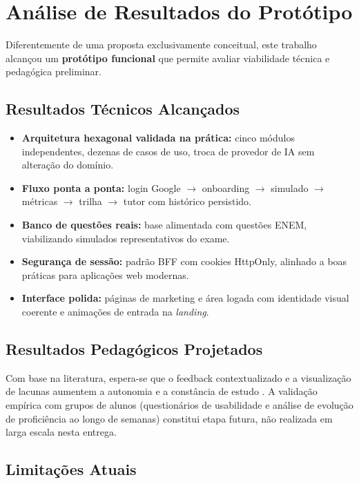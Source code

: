 \documentclass[12pt]{article}
\begin{document}
\section{Análise de Resultados do Protótipo}
\label{sec:resultados}

Diferentemente de uma proposta exclusivamente conceitual, este trabalho alcançou um \textbf{protótipo funcional} que permite avaliar viabilidade técnica e pedagógica preliminar.

\subsection{Resultados Técnicos Alcançados}

\begin{itemize}
    \item \textbf{Arquitetura hexagonal validada na prática:} cinco módulos independentes, dezenas de casos de uso, troca de provedor de IA sem alteração do domínio.
    \item \textbf{Fluxo ponta a ponta:} login Google $\rightarrow$ onboarding $\rightarrow$ simulado $\rightarrow$ métricas $\rightarrow$ trilha $\rightarrow$ tutor com histórico persistido.
    \item \textbf{Banco de questões reais:} base alimentada com questões ENEM, viabilizando simulados representativos do exame.
    \item \textbf{Segurança de sessão:} padrão BFF com cookies HttpOnly, alinhado a boas práticas para aplicações web modernas.
    \item \textbf{Interface polida:} páginas de marketing e área logada com identidade visual coerente e animações de entrada na \textit{landing}.
\end{itemize}

\subsection{Resultados Pedagógicos Projetados}

Com base na literatura, espera-se que o feedback contextualizado e a visualização de lacunas aumentem a autonomia e a constância de estudo \cite{behar2023,latitude2023}. A validação empírica com grupos de alunos (questionários de usabilidade e análise de evolução de proficiência ao longo de semanas) constitui etapa futura, não realizada em larga escala nesta entrega.

\subsection{Limitações Atuais}
\end{document}

